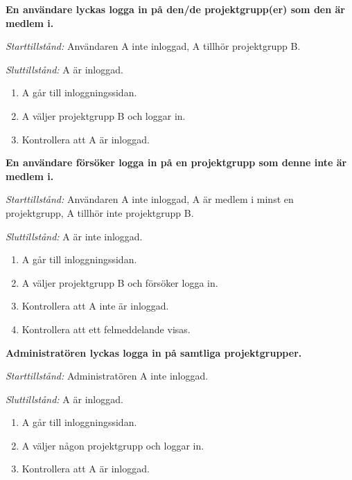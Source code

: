 \documentclass[a4paper]{article}
\begin{document}
\begin{FT}
\item
\textbf{En användare lyckas logga in på den/de projektgrupp(er) som den är medlem i.}

\emph{Starttillstånd:} Användaren A inte inloggad, A tillhör projektgrupp B.

\emph{Sluttillstånd:} A är inloggad.

\begin{enumerate}
\item A går till inloggningssidan.
\item A väljer projektgrupp B och loggar in.
\item Kontrollera att A är inloggad.
\end{enumerate}

\item
\textbf{En användare försöker logga in på en projektgrupp som denne inte är medlem i.}

\emph{Starttillstånd:} Användaren A inte inloggad, A är medlem i minst en projektgrupp, A tillhör inte projektgrupp B.

\emph{Sluttillstånd:} A är inte inloggad.

\begin{enumerate}
\item A går till inloggningssidan.
\item A väljer projektgrupp B och försöker logga in.
\item Kontrollera att A inte är inloggad.
\item Kontrollera att ett felmeddelande visas.
\end{enumerate}

\item
\textbf{Administratören lyckas logga in på samtliga projektgrupper.}

\emph{Starttillstånd:} Administratören A inte inloggad.

\emph{Sluttillstånd:} A är inloggad.

\begin{enumerate}
\item A går till inloggningssidan.
\item A väljer någon projektgrupp och loggar in.
\item Kontrollera att A är inloggad.
\end{enumerate}
\end{FT}

\end{document}
